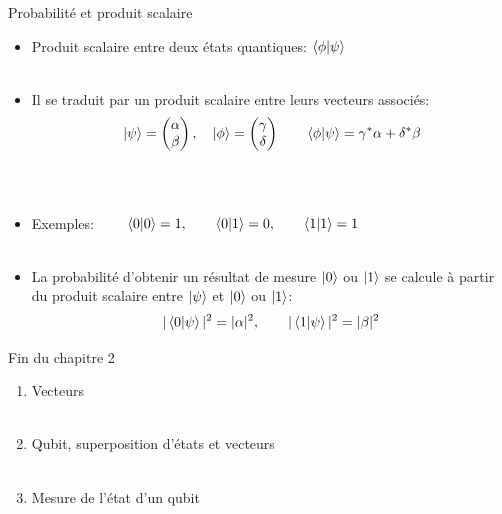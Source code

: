 \documentclass[aspectratio=169,12pt]{beamer}
\begin{document}
\begin{frame}{Probabilité et produit scalaire}
      \begin{itemize}[<+->]
        \setlength{\itemsep}{0.6em}
        \item Produit scalaire entre deux états quantiques: $\braket{\phi}{\psi}$\\~\\
        \item Il se traduit par un produit scalaire entre leurs vecteurs associés:\\
         $$\ket \psi = \begin{pmatrix} \alpha \\ \beta \end{pmatrix},\quad  \ket \phi = \begin{pmatrix} \gamma \\ \delta \end{pmatrix} \qquad \braket{\phi}{\psi} =  \gamma^*\alpha + \delta^*\beta$$\\~\\
        \item Exemples: $\qquad \braket{0}{0} = 1, \qquad \braket{0}{1} = 0, \qquad \braket{1}{1} = 1$\\~\\
        \item La probabilité d'obtenir un résultat de mesure $\ket  0$ ou $\ket 1$ se calcule à partir du produit scalaire entre $\ket \psi$ et $\ket 0$ ou $\ket 1$:
        $$ |\braket{0}{\psi}|^2 = |\alpha|^2, \qquad  |\braket{1}{\psi}|^2 = |\beta|^2$$
      \end{itemize}
\end{frame}


\begin{frame}{Fin du chapitre 2}
  \begin{enumerate}
    \item Vecteurs\\~\\
    \item Qubit, superposition d'états et vecteurs\\~\\
    \item Mesure de l'état d'un qubit
  \end{enumerate}
\end{frame}
\end{document}
